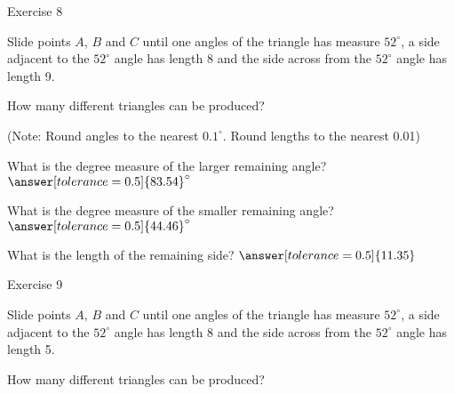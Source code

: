\documentclass{ximera}
\begin{document}
Exercise 8

Slide points $A$, $B$ and $C$ until one angles of the triangle has measure $52^\circ$, a side adjacent to the $52^\circ$ angle has length 8 and the side across from the $52^\circ$ angle has length 9.

\begin{question}
How many different triangles can be produced?
\begin{multipleChoice}
\end{multipleChoice}
\begin{question}
(Note: Round angles to the nearest $0.1^\circ$. Round lengths to the nearest 0.01)

What is the degree measure of the larger remaining angle? $\answer[tolerance=0.5]{83.54}^\circ$

What is the degree measure of the smaller remaining angle? $\answer[tolerance=0.5]{44.46}^\circ$

What is the length of the remaining side? $\answer[tolerance=0.5]{11.35}$

\end{question}
\end{question}

Exercise 9

Slide points $A$, $B$ and $C$ until one angles of the triangle has measure $52^\circ$, a side adjacent to the $52^\circ$ angle has length 8 and the side across from the $52^\circ$ angle has length 5.

\begin{question}
How many different triangles can be produced?
\begin{multipleChoice}
\end{multipleChoice}

\end{question}
\end{document}
